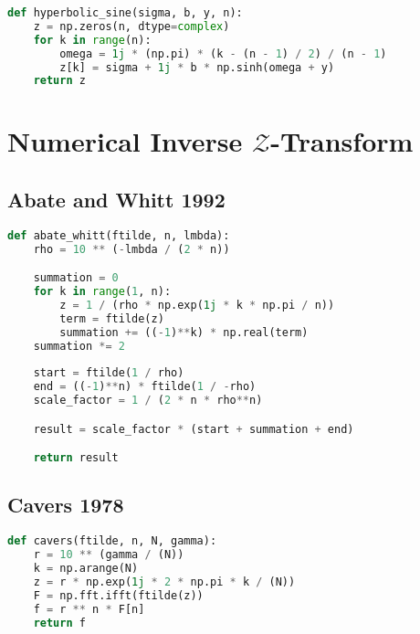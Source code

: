 \begin{appendices}
\begin{lstlisting}[language=Python, caption= Implementation of the conformal mapping (Equation \ref{equation:conformal_mapping}) from $-\frac{\pi}{2} \leq \omega \leq \frac{\pi}{2}$.]
def hyperbolic_sine(sigma, b, y, n):
    z = np.zeros(n, dtype=complex)
    for k in range(n):
        omega = 1j * (np.pi) * (k - (n - 1) / 2) / (n - 1)
        z[k] = sigma + 1j * b * np.sinh(omega + y)
    return z
\end{lstlisting}

\newpage
\section{Numerical Inverse $\mathcal{Z}$-Transform}

\subsection{Abate and Whitt 1992}
\begin{lstlisting}[language=Python, caption= Implementation of \citet{AbateWhitt1992a, AbateWhitt1992b}'s NIZT (Equation \ref{eq:aw_inversion}).]
def abate_whitt(ftilde, n, lmbda):
    rho = 10 ** (-lmbda / (2 * n))

    summation = 0
    for k in range(1, n):
        z = 1 / (rho * np.exp(1j * k * np.pi / n))
        term = ftilde(z)
        summation += ((-1)**k) * np.real(term)
    summation *= 2
    
    start = ftilde(1 / rho)
    end = ((-1)**n) * ftilde(1 / -rho)
    scale_factor = 1 / (2 * n * rho**n)

    result = scale_factor * (start + summation + end)

    return result
\end{lstlisting}

\subsection{Cavers 1978}
\begin{lstlisting}[language=Python, caption= Implementation of \citet{Cavers1978FFT}'s FFT NIZT (Equation \ref{cavers})]
def cavers(ftilde, n, N, gamma):
    r = 10 ** (gamma / (N))
    k = np.arange(N)
    z = r * np.exp(1j * 2 * np.pi * k / (N))
    F = np.fft.ifft(ftilde(z))
    f = r ** n * F[n]
    return f
\end{lstlisting}


\end{appendices}
